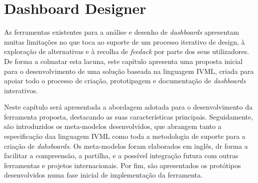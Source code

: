 
%

\chapter{Dashboard Designer}
\label{cha:dashboard_designer}



As ferramentas existentes para a análise e desenho de \textit{dashboards} apresentam muitas limitações no que toca ao suporte de um processo iterativo de design, à exploração de alternativas e à recolha de \textit{feedack} por parte dos seus utilizadores. De forma a colmatar esta lacuna, este capítulo apresenta uma proposta inicial para o desenvolvimento de uma solução baseada na linguagem \gls{IVML}, criada para apoiar todo o processo de criação, prototipagem e documentação de \textit{dashboards} interativos.

Neste capítulo será apresentada a abordagem adotada para o desenvolvimento da ferramenta proposta, destacando as suas características principais. Seguidamente, são introduzidos os meta-modelos desenvolvidos, que abrangem tanto a especificação daa linguagem \gls{IVML} como toda a metodologia de suporte para a criação de \textit{dahsboards}. Os meta-modelos foram elaborados em inglês, dr forma a facilitar a compreensão, a partilha, e a possível integração futura com outras ferramentas e projetos internacionais. Por fim, são apresentados os protótipos desenvolvidos numa fase inicial de implementação da ferramenta.

